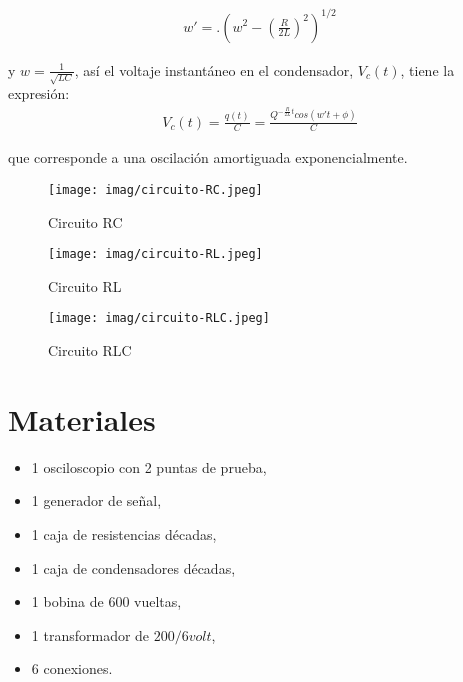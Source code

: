 \documentclass[]{article}
\begin{document}
\begin{enumerate}
\begin{enumerate}
            \begin{align*}
                  w' = .\left(w^2 - \left(\frac{R}{2L}\right)^2 \right)^{1/2}
            \end{align*}

            y $w = \frac{1}{\sqrt{LC}}$, así el voltaje instantáneo en el condensador, $V_c (t)$, tiene la expresión:
            \begin{align*}
                  V_c(t) = \frac{q(t)}{C} = \frac{Q^{-\frac{R}{2L}t}cos(w't + \phi)}{C}
            \end{align*}

            que corresponde a una oscilación amortiguada exponencialmente.
      \end{enumerate}

\end{enumerate}

\begin{figure}
      \centering
      \texttt{[image: imag/circuito-RC.jpeg]}
      \caption{\label{fig: circuito-RC} Circuito RC}
\end{figure}

\begin{figure}
      \centering
      \texttt{[image: imag/circuito-RL.jpeg]}
      \caption{\label{fig: circuito-RL} Circuito RL}
\end{figure}

\begin{figure}
      \centering
      \texttt{[image: imag/circuito-RLC.jpeg]}
      \caption{\label{fig: circuito-RLC} Circuito RLC}
\end{figure}




\section{Materiales}
\begin{itemize}
      \item 1 osciloscopio con 2 puntas de prueba,
      \item 1 generador de señal,
      \item 1 caja de resistencias décadas,
      \item 1 caja de condensadores décadas,
      \item 1 bobina de 600 vueltas,
      \item 1 transformador de $200/6 volt$,
      \item 6 conexiones.
\end{itemize}
\end{document}
